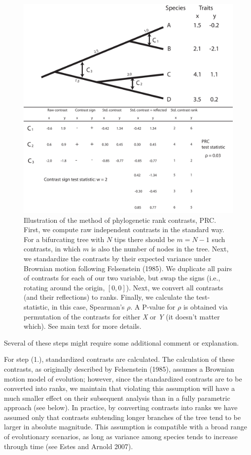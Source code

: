 \documentclass[fleqn,10pt,lineno]{wlpeerj} %
\begin{document}
\begin{figure}
\includegraphics[width=1\linewidth]{Harmon-fig1} \caption{Illustration of the method of phylogenetic rank contrasts, PRC. First, we compute raw independent contrasts in the standard way. For a bifurcating tree with $N$ tips there should be $m=N-1$ such contrasts, in which $m$ is also the number of nodes in the tree. Next, we standardize the contrasts by their expected variance under Brownian motion following Felsenstein (1985). We duplicate all pairs of contrasts for each of our two variable, but swap the signs (i.e., rotating around the origin, $[0,0]$). Next, we convert all contrasts (and their reflections) to ranks. Finally, we calculate the test-statistic, in this case, Spearman's $\rho$. A P-value for $\rho$ is obtained via permutation of the contrasts for either \emph{X} or \emph{Y} (it doesn't matter which). See main text for more details.}\label{fig:Harmon-fig1}
\end{figure}

Several of these steps might require some additional comment or explanation.

For step (1.), standardized contrasts are calculated. The calculation of these contrasts, as originally described by Felsenstein (1985), assumes a Brownian motion model of evolution; however, since the standardized contrasts are to be converted into ranks, we maintain that violating this assumption will have a much smaller effect on their subsequent analysis than in a fully parametric approach (see below). In practice, by converting contrasts into ranks we have assumed only that contrasts subtending longer branches of the tree tend to be larger in absolute magnitude. This assumption is compatible with a broad range of evolutionary scenarios, as long as variance among species tends to increase through time (see Estes and Arnold 2007).
\end{document}
